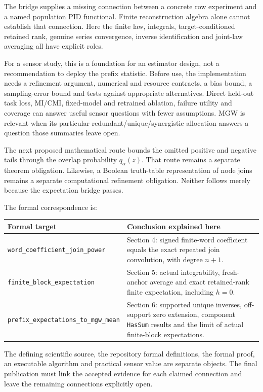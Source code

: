 \label{what-this-adds-and-what-must-come-next}

The bridge supplies a missing connection between a concrete row experiment and a named population PID functional. Finite reconstruction algebra alone cannot establish that connection. Here the finite law, integrals, target-conditioned retained rank, genuine series convergence, inverse identification and joint-law averaging all have explicit roles.

For a sensor study, this is a foundation for an estimator design, not a recommendation to deploy the prefix statistic. Before use, the implementation needs a refinement argument, numerical and resource contracts, a bias bound, a sampling-error bound and tests against appropriate alternatives. Direct held-out task loss, MI/CMI, fixed-model and retrained ablation, failure utility and coverage can answer useful sensor questions with fewer assumptions. MGW is relevant when its particular redundant/unique/synergistic allocation answers a question those summaries leave open.

The next proposed mathematical route bounds the omitted positive and negative tails through the overlap probability \(q_\alpha(z)\). That route remains a separate theorem obligation. Likewise, a Boolean truth-table representation of node joins remains a separate computational refinement obligation. Neither follows merely because the expectation bridge passes.

The formal correspondence is:

{\def\LTcaptype{none} %
\begin{longtable}[]{@{}
  >{\raggedright\arraybackslash}p{}
  >{\raggedright\arraybackslash}p{}@{}}
\toprule\noalign{}
\begin{minipage}[b]{\linewidth}\raggedright
Formal target
\end{minipage} & \begin{minipage}[b]{\linewidth}\raggedright
Conclusion explained here
\end{minipage} \\
\midrule\noalign{}
\endhead
\bottomrule\noalign{}
\endlastfoot
\texttt{word\_coefficient\_join\_power} & Section 4: signed finite-word coefficient equals the exact repeated join convolution, with degree \(n+1\). \\
\texttt{finite\_block\_expectation} & Section 5: actual integrability, fresh-anchor average and exact retained-rank finite expectation, including \(h=0\). \\
\texttt{prefix\_expectations\_to\_mgw\_mean} & Section 6: supported unique inverses, off-support zero extension, component \texttt{HasSum} results and the limit of actual finite-block expectations. \\
\end{longtable}
}

The defining scientific source, the repository formal definitions, the formal proof, an executable algorithm and practical sensor value are separate objects. The final publication must link the accepted evidence for each claimed connection and leave the remaining connections explicitly open.
